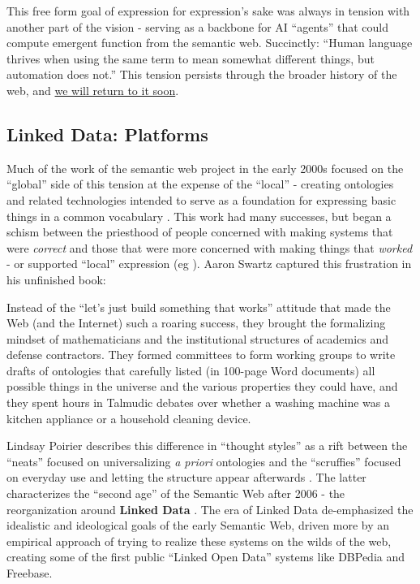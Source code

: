This free form goal of expression for expression's sake was always in
tension with another part of the vision - serving as a backbone for AI
``agents'' that could compute emergent function from the semantic web.
Succinctly: ``Human language thrives when using the same term to mean
somewhat different things, but automation does not.'' \cite{berners-leeSemanticWeb2001}  This tension persists through the
broader history of the web, and
\protect\hyperlink{the-near-future-of-surveillance-capitalism-knowledge-graphs-get-chatbots.}{we
will return to it soon}.

\hypertarget{linked-data-platforms}{%
\subsection{Linked Data: Platforms}\label{linked-data-platforms}}

Much of the work of the semantic web project in the early 2000s focused
on the ``global'' side of this tension at the expense of the ``local'' -
creating ontologies and related technologies intended to serve as a
foundation for expressing basic things in a common vocabulary \cite{hitzlerReviewSemanticWeb2021} . This work had many successes, but
began a schism between the priesthood of people concerned with making
systems that were \emph{correct} and those that were more concerned with
making things that \emph{worked} - or supported ``local'' expression (eg
\cite{palmerDitchingSemanticWeb2008} ). Aaron Swartz captured
this frustration in his unfinished book:

\begin{leftbar}
Instead of the ``let's just build something that works'' attitude that
made the Web (and the Internet) such a roaring success, they brought the
formalizing mindset of mathematicians and the institutional structures
of academics and defense contractors. They formed committees to form
working groups to write drafts of ontologies that carefully listed (in
100-page Word documents) all possible things in the universe and the
various properties they could have, and they spent hours in Talmudic
debates over whether a washing machine was a kitchen appliance or a
household cleaning device. \cite{swartzAaronSwartzProgrammable2013} 
\end{leftbar}

Lindsay Poirier describes this difference in ``thought styles'' as a
rift between the ``neats'' focused on universalizing \emph{a priori}
ontologies and the ``scruffies'' focused on everyday use and letting the
structure appear afterwards \cite{poirierTurnScruffyEthnographic2017} . The latter characterizes the ``second age'' of the Semantic Web
after 2006 - the reorganization around \textbf{Linked Data} \cite{berners-leeLinkedData2006, hitzlerReviewSemanticWeb2021} . The era of
Linked Data de-emphasized the idealistic and ideological goals of the
early Semantic Web, driven more by an empirical approach of trying to
realize these systems on the wilds of the web, creating some of the
first public ``Linked Open Data'' systems like DBPedia and Freebase.

